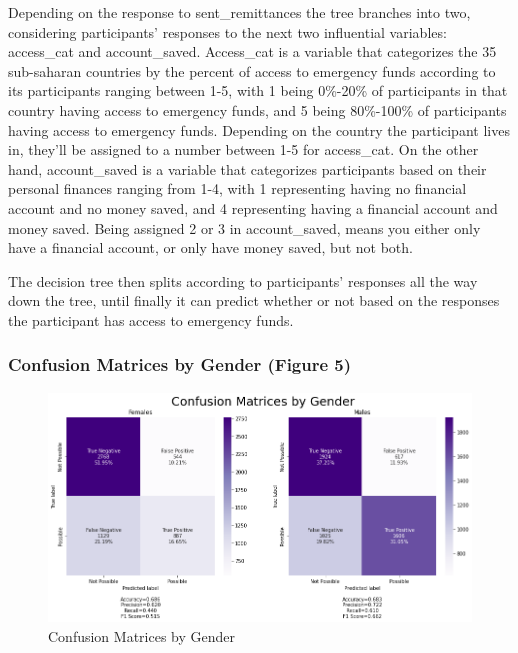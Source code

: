 \documentclass[water,article,submit,moreauthors,pdftex]{mdpi}
\begin{document}
Depending on the response to sent\_remittances the tree branches into
two, considering participants' responses to the next two influential
variables: access\_cat and account\_saved. Access\_cat is a variable
that categorizes the 35 sub-saharan countries by the percent of access
to emergency funds according to its participants ranging between 1-5,
with 1 being 0\%-20\% of participants in that country having access to
emergency funds, and 5 being 80\%-100\% of participants having access to
emergency funds. Depending on the country the participant lives in,
they'll be assigned to a number between 1-5 for access\_cat. On the
other hand, account\_saved is a variable that categorizes participants
based on their personal finances ranging from 1-4, with 1 representing
having no financial account and no money saved, and 4 representing
having a financial account and money saved. Being assigned 2 or 3 in
account\_saved, means you either only have a financial account, or only
have money saved, but not both.

The decision tree then splits according to participants' responses all
the way down the tree, until finally it can predict whether or not based
on the responses the participant has access to emergency funds.

\hypertarget{confusion-matrices-by-gender-figure-5}{%
\subsubsection{Confusion Matrices by Gender (Figure
5)}\label{confusion-matrices-by-gender-figure-5}}

\begin{figure}
\centering
\includegraphics[width=\textwidth,height=0.5\textheight]{images/confusionMatrices.png}
\caption{Confusion Matrices by Gender}
\end{figure}
\end{document}

